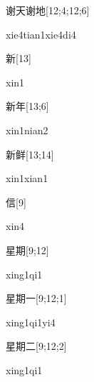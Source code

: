 \begin{verbete}{谢天谢地}[12;4;12;6]
\begin{pronuncia}[\\]{xie4tian1xie4di4}
\end{pronuncia}
\end{verbete}

\begin{verbete}[xin1]{新}[13]
\begin{pronuncia}{xin1}
\end{pronuncia}
\end{verbete}

\begin{verbete}{新年}[13;6]
\begin{pronuncia}{xin1nian2}
\end{pronuncia}
\end{verbete}

\begin{verbete}{新鲜}[13;14]
\begin{pronuncia}{xin1xian1}
\end{pronuncia}
\end{verbete}

\begin{verbete}[xin4]{信}[9]
\begin{pronuncia}{xin4}
\end{pronuncia}
\end{verbete}

\begin{verbete}[xing1qi1]{星期}[9;12]
\begin{pronuncia}{xing1qi1}
\end{pronuncia}
\end{verbete}

\begin{verbete}[xing1qi1yi4]{星期一}[9;12;1]
\begin{pronuncia}{xing1qi1yi4}
\end{pronuncia}
\end{verbete}

\begin{verbete}[xing1qi1]{星期二}[9;12;2]
\begin{pronuncia}{xing1qi1}
\end{pronuncia}
\end{verbete}

